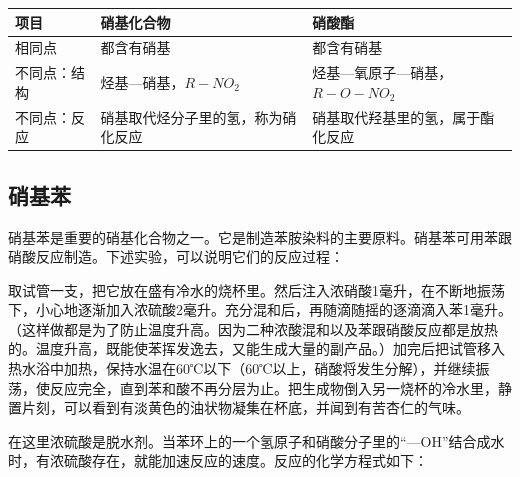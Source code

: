 {\def\LTcaptype{none} %
\begin{longtable}[]{@{}
  >{\raggedright\arraybackslash}p{}
  >{\raggedright\arraybackslash}p{}
  >{\raggedright\arraybackslash}p{}@{}}
\toprule\noalign{}
\begin{minipage}[b]{\linewidth}\raggedright
项目
\end{minipage} & \begin{minipage}[b]{\linewidth}\raggedright
硝基化合物
\end{minipage} & \begin{minipage}[b]{\linewidth}\raggedright
硝酸酯
\end{minipage} \\
\midrule\noalign{}
\endhead
\bottomrule\noalign{}
\endlastfoot
相同点 & 都含有硝基 & 都含有硝基 \\
不同点：结构 & 烃基---硝基，\(R-NO_2\) &
烃基---氧原子---硝基，\(R-O-NO_2\) \\
不同点：反应 & 硝基取代烃分子里的氢，称为硝化反应 &
硝基取代羟基里的氢，属于酯化反应 \\
\end{longtable}
}

\subsection{硝基苯}

硝基苯是重要的硝基化合物之一。它是制造苯胺染料的主要原料。硝基苯可用苯跟硝酸反应制造。下述实验，可以说明它们的反应过程：

取试管一支，把它放在盛有冷水的烧杯里。然后注入浓硝酸1毫升，在不断地振荡下，小心地逐渐加入浓硫酸2毫升。充分混和后，再随滴随摇的逐滴滴入苯1毫升。（这样做都是为了防止温度升高。因为二种浓酸混和以及苯跟硝酸反应都是放热的。温度升高，既能使苯挥发逸去，又能生成大量的副产品。）加完后把试管移入热水浴中加热，保持水温在60℃以下（60℃以上，硝酸将发生分解），并继续振荡，使反应完全，直到苯和酸不再分层为止。把生成物倒入另一烧杯的冷水里，静置片刻，可以看到有淡黄色的油状物凝集在杯底，并闻到有苦杏仁的气味。

在这里浓硫酸是脱水剂。当苯环上的一个氢原子和硝酸分子里的``---OH''结合成水时，有浓硫酸存在，就能加速反应的速度。反应的化学方程式如下：

